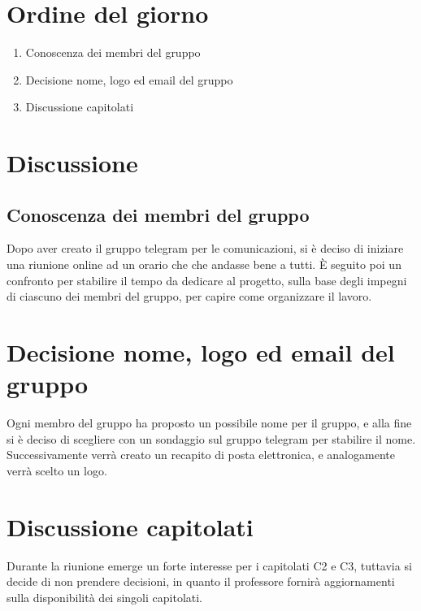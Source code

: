 \documentclass[a4paper,12pt]{article}
\begin{document}
\section*{Ordine del giorno}
\begin{enumerate}
\item Conoscenza dei membri del gruppo
\item Decisione nome, logo ed email del gruppo
\item Discussione capitolati %
\end{enumerate}

\section*{Discussione}
\subsection*{Conoscenza dei membri del gruppo}
Dopo aver creato il gruppo telegram per le comunicazioni, si è deciso di iniziare una riunione online ad un orario che che andasse bene a tutti. È seguito poi un confronto per stabilire il tempo da dedicare al progetto, sulla base degli impegni di ciascuno dei membri del gruppo, per capire come organizzare il lavoro.
\section*{Decisione nome, logo ed email del gruppo}
Ogni membro del gruppo ha proposto un possibile nome per il gruppo, e alla fine si è deciso di scegliere con un sondaggio sul gruppo telegram per stabilire il nome. Successivamente verrà creato un recapito di posta elettronica, e analogamente verrà scelto un logo.
\section*{Discussione capitolati}
Durante la riunione emerge un forte interesse per i capitolati C2 e C3, tuttavia si decide di non prendere decisioni, in quanto il professore fornirà aggiornamenti sulla disponibilità dei singoli capitolati.
\end{document}
